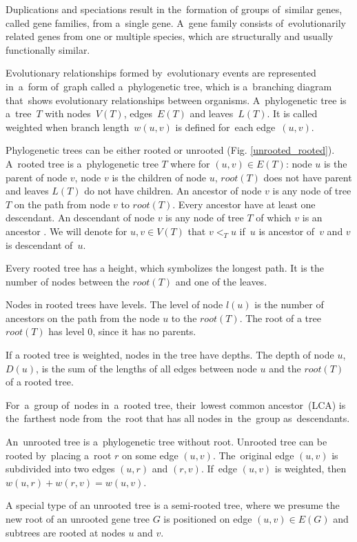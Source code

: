 Duplications and speciations result in the~formation of groups of~similar genes, called gene families, from a~single gene. A~gene family consists of~evolutionarily related genes from one or multiple species, which are structurally and usually functionally similar.

Evolutionary relationships formed by~evolutionary events are represented in~a~form of~graph called a~phylogenetic tree, which is a~branching diagram that~shows evolutionary relationships between organisms. A~phylogenetic tree is a~tree~$T$ with nodes~$V(T)$, edges~$E(T)$ and leaves~$L(T)$. It is called weighted when branch length~$w(u, v)$ is defined for~each edge~$(u, v)$.

Phylogenetic trees can be either rooted or unrooted (Fig. \ref{unrooted_rooted}). A~rooted tree is a~phylogenetic tree $T$ where for $(u, v) \in E(T)$: node $u$ is the parent of node $v$, node $v$ is the children of node $u$, $root(T)$ does not have parent and leaves $L(T)$ do not have children. An ancestor of node $v$ is any node of tree $T$ on the path from node $v$ to $root(T)$. Every ancestor have at least one descendant. An descendant of node $v$ is any node of tree $T$ of which $v$ is an ancestor \cite{hasic}. We will denote for $u, v \in V(T)$ that $v<_Tu$ if~$u$ is ancestor of~$v$ and $v$ is descendant of~$u$.

Every rooted tree has a height, which symbolizes the longest path. It is the number of nodes between the $root(T)$ and one of the leaves. 

Nodes in rooted trees have levels. The level of node $l(u)$ is the number of ancestors on the path from the node $u$ to the $root(T)$. The root of a tree $root(T)$ has level 0, since it has no parents.

If a rooted tree is weighted, nodes in the tree have depths. The depth of node $u$, $D(u)$, is the sum of the lengths of all edges between node $u$ and the $root(T)$ of a rooted tree.

For~a~group of~nodes in~a~rooted tree, their~lowest common ancestor~(LCA) is the~farthest node from~the~root that has all nodes in~the~group as~descendants.

An~unrooted tree is a~phylogenetic tree without root. Unrooted tree can be rooted by~placing a~root $r$ on some edge $(u, v)$. The~original edge $(u, v)$ is subdivided into two edges $(u, r)$ and $(r, v)$. If~edge $(u, v)$ is weighted, then $w(u, r) + w(r, v) = w(u, v)$.

A special type of an unrooted tree is a semi-rooted tree, where we presume the new root of an unrooted gene tree $G$ is positioned on edge $(u, v) \in E(G)$ and subtrees are rooted at nodes $u$ and $v$.

